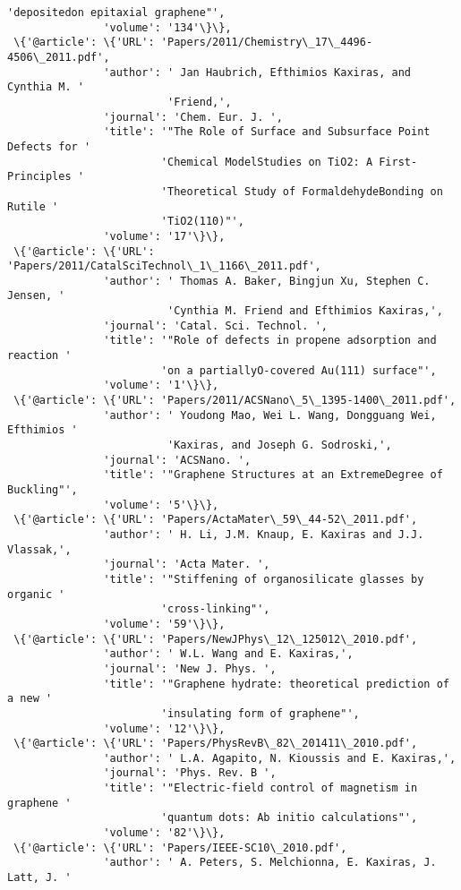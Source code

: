 \documentclass[11pt]{article}
\begin{document}
\begin{Verbatim}[commandchars=\\\{\}]
                        'depositedon epitaxial graphene"',
               'volume': '134'\}\},
 \{'@article': \{'URL': 'Papers/2011/Chemistry\_17\_4496-4506\_2011.pdf',
               'author': ' Jan Haubrich, Efthimios Kaxiras, and Cynthia M. '
                         'Friend,',
               'journal': 'Chem. Eur. J. ',
               'title': '"The Role of Surface and Subsurface Point Defects for '
                        'Chemical ModelStudies on TiO2: A First-Principles '
                        'Theoretical Study of FormaldehydeBonding on Rutile '
                        'TiO2(110)"',
               'volume': '17'\}\},
 \{'@article': \{'URL': 'Papers/2011/CatalSciTechnol\_1\_1166\_2011.pdf',
               'author': ' Thomas A. Baker, Bingjun Xu, Stephen C. Jensen, '
                         'Cynthia M. Friend and Efthimios Kaxiras,',
               'journal': 'Catal. Sci. Technol. ',
               'title': '"Role of defects in propene adsorption and reaction '
                        'on a partiallyO-covered Au(111) surface"',
               'volume': '1'\}\},
 \{'@article': \{'URL': 'Papers/2011/ACSNano\_5\_1395-1400\_2011.pdf',
               'author': ' Youdong Mao, Wei L. Wang, Dongguang Wei, Efthimios '
                         'Kaxiras, and Joseph G. Sodroski,',
               'journal': 'ACSNano. ',
               'title': '"Graphene Structures at an ExtremeDegree of Buckling"',
               'volume': '5'\}\},
 \{'@article': \{'URL': 'Papers/ActaMater\_59\_44-52\_2011.pdf',
               'author': ' H. Li, J.M. Knaup, E. Kaxiras and J.J. Vlassak,',
               'journal': 'Acta Mater. ',
               'title': '"Stiffening of organosilicate glasses by organic '
                        'cross-linking"',
               'volume': '59'\}\},
 \{'@article': \{'URL': 'Papers/NewJPhys\_12\_125012\_2010.pdf',
               'author': ' W.L. Wang and E. Kaxiras,',
               'journal': 'New J. Phys. ',
               'title': '"Graphene hydrate: theoretical prediction of a new '
                        'insulating form of graphene"',
               'volume': '12'\}\},
 \{'@article': \{'URL': 'Papers/PhysRevB\_82\_201411\_2010.pdf',
               'author': ' L.A. Agapito, N. Kioussis and E. Kaxiras,',
               'journal': 'Phys. Rev. B ',
               'title': '"Electric-field control of magnetism in graphene '
                        'quantum dots: Ab initio calculations"',
               'volume': '82'\}\},
 \{'@article': \{'URL': 'Papers/IEEE-SC10\_2010.pdf',
               'author': ' A. Peters, S. Melchionna, E. Kaxiras, J. Latt, J. '

\end{Verbatim}
\end{document}

